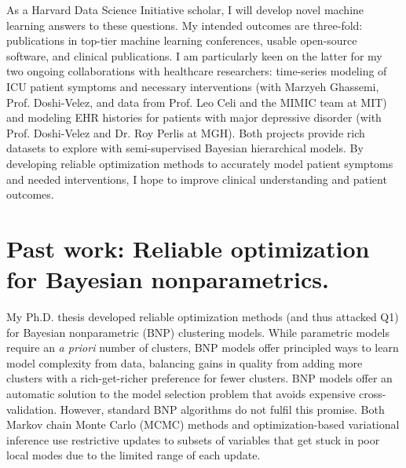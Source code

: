 \documentclass[11pt,letterpaper]{article}
\begin{document}
As a Harvard Data Science Initiative scholar, 
I will develop novel machine learning answers to these questions.
My intended outcomes are three-fold: publications in top-tier machine learning conferences, usable open-source software,
and clinical publications.
I am particularly keen on the latter for my two ongoing collaborations with healthcare researchers:
time-series modeling of ICU patient symptoms and necessary interventions (with Marzyeh Ghassemi, Prof. Doshi-Velez, and data from Prof. Leo Celi and the MIMIC team at MIT)
and modeling EHR histories for patients with major depressive disorder (with Prof. Doshi-Velez and Dr. Roy Perlis at MGH).
Both projects provide rich datasets to explore with semi-supervised Bayesian hierarchical models. By developing reliable optimization methods to accurately model patient symptoms and needed interventions, I hope to improve clinical understanding and patient outcomes.






\section{Past work: Reliable optimization for Bayesian nonparametrics.}

My Ph.D. thesis developed reliable optimization methods (and thus attacked Q1) for Bayesian nonparametric (BNP) clustering models.
While parametric models require an \emph{a priori} number of clusters,
BNP models offer principled ways to 
learn model complexity from data,
balancing gains in quality from adding more clusters with a rich-get-richer preference for fewer clusters.
BNP models offer an automatic solution to the model selection problem that avoids expensive cross-validation. 
However, standard BNP algorithms do not fulfil this promise. Both Markov chain Monte Carlo (MCMC) methods and optimization-based variational inference use restrictive updates to subsets of variables that get stuck in poor local modes due to the limited range of each update.
\end{document}
